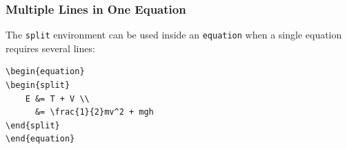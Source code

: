 \subsubsection{Multiple Lines in One Equation}

The \texttt{split} environment can be used inside an
\texttt{equation} when a single equation requires several lines:

\begin{lstlisting}[style=latex]
\begin{equation}
\begin{split}
    E &= T + V \\
      &= \frac{1}{2}mv^2 + mgh
\end{split}
\end{equation}
\end{lstlisting}